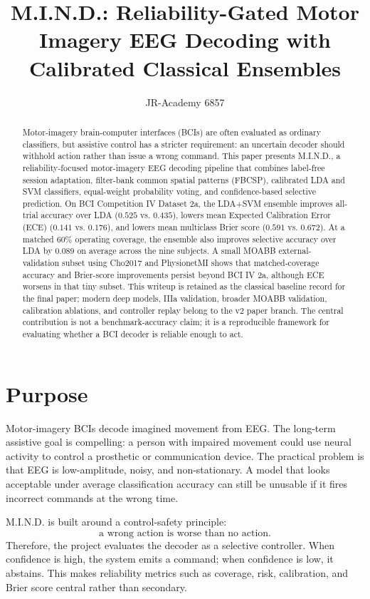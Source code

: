 \documentclass[11pt]{article}
\title{M.I.N.D.: Reliability-Gated Motor Imagery EEG Decoding with Calibrated Classical Ensembles}
\author{JR-Academy 6857}
\date{}
\begin{document}
\maketitle

\begin{abstract}
Motor-imagery brain-computer interfaces (BCIs) are often evaluated as ordinary
classifiers, but assistive control has a stricter requirement: an uncertain
decoder should withhold action rather than issue a wrong command. This paper
presents M.I.N.D., a reliability-focused motor-imagery EEG decoding pipeline
that combines label-free session adaptation, filter-bank common spatial
patterns (FBCSP), calibrated LDA and SVM classifiers, equal-weight probability
voting, and confidence-based selective prediction. On BCI Competition IV
Dataset 2a, the LDA+SVM ensemble improves all-trial accuracy over LDA
(\(0.525\) vs. \(0.435\)), lowers mean Expected Calibration Error (ECE)
(\(0.141\) vs. \(0.176\)), and lowers mean multiclass Brier score
(\(0.591\) vs. \(0.672\)). At a matched 60\% operating coverage, the ensemble
also improves selective accuracy over LDA by \(0.089\) on average across the
nine subjects. A small MOABB external-validation subset using Cho2017 and
PhysionetMI shows that matched-coverage accuracy and Brier-score improvements
persist beyond BCI IV 2a, although ECE worsens in that tiny subset. This
writeup is retained as the classical baseline record for the final paper;
modern deep models, IIIa validation, broader MOABB validation, calibration
ablations, and controller replay belong to the v2 paper branch. The central
contribution is not a benchmark-accuracy claim; it is a reproducible
framework for evaluating whether a BCI decoder is reliable enough to act.
\end{abstract}

\section{Purpose}

Motor-imagery BCIs decode imagined movement from EEG. The long-term assistive
goal is compelling: a person with impaired movement could use neural activity
to control a prosthetic or communication device. The practical problem is that
EEG is low-amplitude, noisy, and non-stationary. A model that looks acceptable
under average classification accuracy can still be unusable if it fires
incorrect commands at the wrong time.

M.I.N.D. is built around a control-safety principle:
\[
  \text{a wrong action is worse than no action.}
\]
Therefore, the project evaluates the decoder as a selective controller. When
confidence is high, the system emits a command; when confidence is low, it
abstains. This makes reliability metrics such as coverage, risk, calibration,
and Brier score central rather than secondary.
\end{document}
